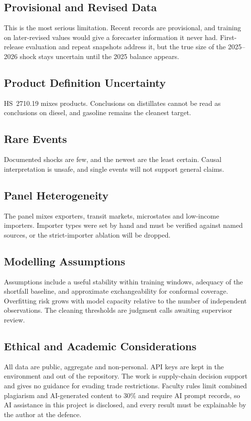 \documentclass[conference]{IEEEtran}
\begin{document}
\subsection{Provisional and Revised Data}
This is the most serious limitation. Recent records are provisional, and training on later-revised values would give a forecaster information it never had. First-release evaluation and repeat snapshots address it, but the true size of the 2025--2026 shock stays uncertain until the 2025 balance appears.

\subsection{Product Definition Uncertainty}
HS~2710.19 mixes products. Conclusions on distillates cannot be read as conclusions on diesel, and gasoline remains the cleanest target.

\subsection{Rare Events}
Documented shocks are few, and the newest are the least certain. Causal interpretation is unsafe, and single events will not support general claims.

\subsection{Panel Heterogeneity}
The panel mixes exporters, transit markets, microstates and low-income importers. Importer types were set by hand and must be verified against named sources, or the strict-importer ablation will be dropped.

\subsection{Modelling Assumptions}
Assumptions include a useful stability within training windows, adequacy of the shortfall baseline, and approximate exchangeability for conformal coverage. Overfitting risk grows with model capacity relative to the number of independent observations. The cleaning thresholds are judgment calls awaiting supervisor review.

\subsection{Ethical and Academic Considerations}
All data are public, aggregate and non-personal. API keys are kept in the environment and out of the repository. The work is supply-chain decision support and gives no guidance for evading trade restrictions. Faculty rules limit combined plagiarism and AI-generated content to 30\% and require AI prompt records, so AI assistance in this project is disclosed, and every result must be explainable by the author at the defence.
\end{document}
